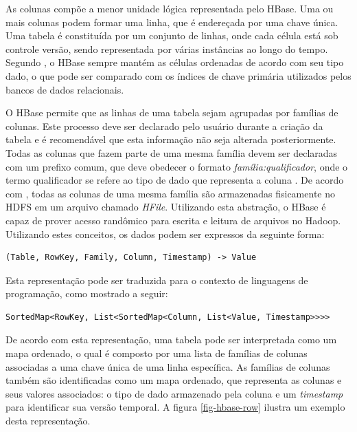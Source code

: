 As colunas compõe a menor unidade lógica representada pelo HBase. Uma ou mais colunas podem formar uma linha, que é endereçada por uma chave única. Uma tabela é constituída por um conjunto de linhas, onde cada célula está sob controle versão, sendo representada por várias instâncias ao longo do tempo. Segundo , o HBase sempre mantém as células ordenadas de acordo com seu tipo dado, o que pode ser comparado com os índices de chave primária utilizados pelos bancos de dados relacionais.

O HBase permite que as linhas de uma tabela sejam agrupadas por famílias de colunas. Este processo deve ser declarado pelo usuário durante a criação da tabela e é recomendável que esta informação não seja alterada posteriormente. Todas as colunas que fazem parte de uma mesma família devem ser declaradas com um prefixo comum, que deve obedecer o formato \textit{família:qualificador}, onde o termo qualificador se refere ao tipo de dado que representa a coluna \cite{white2012}. De acordo com , todas as colunas de uma mesma família são armazenadas fisicamente no HDFS em um arquivo chamado \textit{HFile}. Utilizando esta abstração, o HBase é capaz de prover acesso randômico para escrita e leitura de arquivos no Hadoop. Utilizando estes conceitos, os dados podem ser expressos da seguinte forma:

\begin{lstlisting}[style=abnt,frame=none]
(Table, RowKey, Family, Column, Timestamp) -> Value
\end{lstlisting}

Esta representação pode ser traduzida para o contexto de linguagens de programação, como mostrado a seguir:

\begin{lstlisting}[style=abnt,frame=none]
SortedMap<RowKey, List<SortedMap<Column, List<Value, Timestamp>>>>
\end{lstlisting}

De acordo com esta representação, uma tabela pode ser interpretada como um mapa ordenado, o qual é composto por uma lista de famílias de colunas associadas a uma chave única de uma linha específica. As famílias de colunas também são identificadas como um mapa ordenado, que representa as colunas e seus valores associados: o tipo de dado armazenado pela coluna e um \textit{timestamp} para identificar sua versão temporal. A figura \ref{fig-hbase-row} ilustra um exemplo desta representação. 

